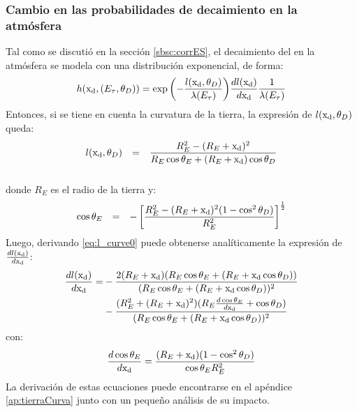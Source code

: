	\subsubsection{Cambio en las probabilidades de decaimiento en la atm\'osfera}
	Tal como se discuti\'o en la secci\'on \ref{sbsc:corrES}, el decaimiento del \tauon{} en la atm\'osfera se modela con una distribuci\'on exponencial, de forma:
	\begin{equation}
		h({\rm x_d},(E_\tau,\theta_D))=
		\exp{\left(
		-\frac{l({\rm x_d},\theta_D)}{\lambda(E_\tau)}
		\right)}
		\frac{dl({\rm x_d})}{d{\rm x_d}}
		\frac{1}{\lambda(E_\tau)}
		\label{eq:decayTayRadio}
	\end{equation}
	Entonces, si se tiene en cuenta la curvatura de la tierra, la expresi\'on de $l({\rm x_d},\theta_D)$ queda:
	\begin{equation}
		\begin{array}{rcl}
		l({\rm x_d},\theta_D) & = & \dfrac{R_E^2-(R_E+{\rm x_d})^2}{R_E \cos \theta_E + (R_E+{\rm x_d}) \cos \theta_D}\\
		&&\\
		\end{array}
		\label{eq:l_curve0}
	\end{equation}
	donde $R_E$ es el radio de la tierra y:
	\begin{equation}
		\begin{array}{rcl}
		\cos \theta_E & = & - \left[ \dfrac{R_E^2 - (R_E+{\rm x_d})^2 (1-\cos^2 \theta_D)}{R_E^2} \right]^{\frac{1}{2}} \\ 
		\end{array}
		\label{eq:te_td0}
	\end{equation}
	Luego, derivando \ref{eq:l_curve0} puede obtenerse anal\'iticamente la expresi\'on de $\frac{dl({\rm x_d})}{d{\rm x_d}}$:
	\begin{equation}
	\begin{aligned}
		\frac{dl({\rm x_d})}{d{\rm x_d}}
		=&-
		\frac{
		2(R_E+{\rm x_d})
		(R_E\cos{\theta_E}+(R_E+{\rm x_d}\cos{\theta_D}))
		}{
		(R_E\cos{\theta_E}+(R_E+{\rm x_d}\cos{\theta_D}))^2
		}\\
		&-
		\frac{(R_E^2+(R_E+{\rm x_d})^2)(R_E\frac{d\cos{\theta_E}}{d{\rm x_d}}+\cos{\theta_D})
		}{
		(R_E\cos{\theta_E}+(R_E+{\rm x_d}\cos{\theta_D}))^2
		}
	\end{aligned}
	\end{equation}
	con:
	\begin{equation}
	\frac{d\cos{\theta_E}}{d{\rm x_d}}
	=
	\frac{
	(R_E+{\rm x_d})
	(1-\cos^2\theta_D)
	}{\cos{\theta_E}R_E^2
	}
	\end{equation}
	La derivaci\'on de estas ecuaciones puede encontrarse en el ap\'endice \ref{ap:tierraCurva} junto con un peque\~no an\'alisis de su impacto.
	
